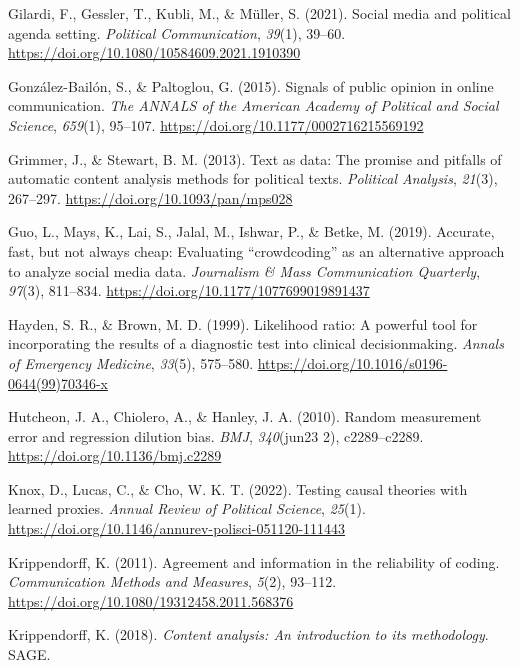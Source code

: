 \documentclass[english,man,floatsintext]{apa6}
\begin{document}
\leavevmode\hypertarget{ref-gilardi:2021:SMP}{}%
Gilardi, F., Gessler, T., Kubli, M., \& Müller, S. (2021). Social media and political agenda setting. \emph{Political Communication}, \emph{39}(1), 39--60. \url{https://doi.org/10.1080/10584609.2021.1910390}

\leavevmode\hypertarget{ref-GonzlezBailn2015}{}%
González-Bailón, S., \& Paltoglou, G. (2015). Signals of public opinion in online communication. \emph{The ANNALS of the American Academy of Political and Social Science}, \emph{659}(1), 95--107. \url{https://doi.org/10.1177/0002716215569192}

\leavevmode\hypertarget{ref-Grimmer2013}{}%
Grimmer, J., \& Stewart, B. M. (2013). Text as data: The promise and pitfalls of automatic content analysis methods for political texts. \emph{Political Analysis}, \emph{21}(3), 267--297. \url{https://doi.org/10.1093/pan/mps028}

\leavevmode\hypertarget{ref-guo:2019:AFB}{}%
Guo, L., Mays, K., Lai, S., Jalal, M., Ishwar, P., \& Betke, M. (2019). Accurate, fast, but not always cheap: Evaluating ``crowdcoding'' as an alternative approach to analyze social media data. \emph{Journalism \& Mass Communication Quarterly}, \emph{97}(3), 811--834. \url{https://doi.org/10.1177/1077699019891437}

\leavevmode\hypertarget{ref-hayden:1999:LR}{}%
Hayden, S. R., \& Brown, M. D. (1999). Likelihood ratio: A powerful tool for incorporating the results of a diagnostic test into clinical decisionmaking. \emph{Annals of Emergency Medicine}, \emph{33}(5), 575--580. \url{https://doi.org/10.1016/s0196-0644(99)70346-x}

\leavevmode\hypertarget{ref-hutcheon:2010:R}{}%
Hutcheon, J. A., Chiolero, A., \& Hanley, J. A. (2010). Random measurement error and regression dilution bias. \emph{BMJ}, \emph{340}(jun23 2), c2289--c2289. \url{https://doi.org/10.1136/bmj.c2289}

\leavevmode\hypertarget{ref-knox:2022:TCT}{}%
Knox, D., Lucas, C., \& Cho, W. K. T. (2022). Testing causal theories with learned proxies. \emph{Annual Review of Political Science}, \emph{25}(1). \url{https://doi.org/10.1146/annurev-polisci-051120-111443}

\leavevmode\hypertarget{ref-krippendorff:2011:AIR}{}%
Krippendorff, K. (2011). Agreement and information in the reliability of coding. \emph{Communication Methods and Measures}, \emph{5}(2), 93--112. \url{https://doi.org/10.1080/19312458.2011.568376}

\leavevmode\hypertarget{ref-krippendorff2018content}{}%
Krippendorff, K. (2018). \emph{Content analysis: An introduction to its methodology}. SAGE.
\end{document}
